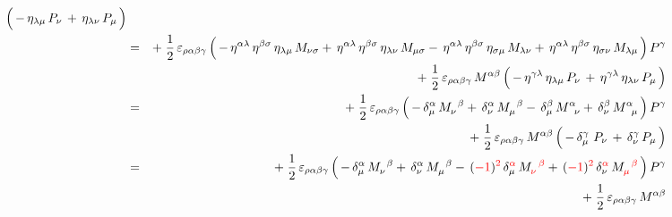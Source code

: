 \begin{enumerate}
\begin{eqnarray*}
		\left(\,
			\overset{{\color{white}.}}{-}\,
			\eta_{\lambda\mu}\,P_{\nu}
			\,+\,
			\eta_{\lambda\nu}\,P_{\mu}
			\,\right)
	\\
	& = &
		{\color{black}+}\;
		\dfrac{1}{2}\,\varepsilon_{\rho\alpha\beta\gamma}
		\left(\,
			\overset{{\color{white}.}}{-}\,
			\eta^{\alpha\lambda}\,\eta^{\beta\sigma}\,\eta_{\lambda\mu}\,M_{\nu\sigma}
			+\,\eta^{\alpha\lambda}\,\eta^{\beta\sigma}\,\eta_{\lambda\nu}\,M_{\mu\sigma}
			-\,\eta^{\alpha\lambda}\,\eta^{\beta\sigma}\,\eta_{\sigma\mu}\,M_{\lambda\nu}
			+\,\eta^{\alpha\lambda}\,\eta^{\beta\sigma}\,\eta_{\sigma\nu}\,M_{\lambda\mu}
			\,\right)
		P^{\gamma}
	\\
	&&
		+\;
		\dfrac{1}{2}\,\varepsilon_{\rho\alpha\beta\gamma}\,M^{\alpha\beta}
		\left(\,
			\overset{{\color{white}.}}{-}\,
			\eta^{\gamma\lambda}\,\eta_{\lambda\mu}\,P_{\nu}
			\,+\,
			\eta^{\gamma\lambda}\,\eta_{\lambda\nu}\,P_{\mu}
			\,\right)
	\\
	& = &
		{\color{black}+}\;
		\dfrac{1}{2}\,\varepsilon_{\rho\alpha\beta\gamma}
		\left(\,
			\overset{{\color{white}.}}{-}\,
			\delta^{\alpha}_{\mu}\,M_{\nu}^{{\color{white}\nu}\beta}
			+\,\delta^{\alpha}_{\nu}\,M_{\mu}^{{\color{white}\mu}\beta}
			-\,\delta^{\beta}_{\mu}\,M^{\alpha}_{{\color{white}\alpha}\nu}
			+\,\delta^{\beta}_{\nu}\,M^{\alpha}_{{\color{white}\alpha}\mu}
			\,\right)
		P^{\gamma}
	\\
	&&
		+\;
		\dfrac{1}{2}\,\varepsilon_{\rho\alpha\beta\gamma}\,M^{\alpha\beta}
		\left(\,
			\overset{{\color{white}.}}{-}\,
			\delta^{\gamma}_{\mu}\,\,P_{\nu}
			\,+\,
			\delta^{\gamma}_{\nu}\,P_{\mu}
			\,\right)
	\\
	& = &
		{\color{black}+}\;
		\dfrac{1}{2}\,\varepsilon_{\rho\alpha\beta\gamma}
		\left(\,
			\overset{{\color{white}.}}{-}\,
			\delta^{\alpha}_{\mu}\,M_{\nu}^{{\color{white}\nu}\beta}
			+\,\delta^{\alpha}_{\nu}\,M_{\mu}^{{\color{white}\mu}\beta}
			-\,({\color{red}-1})^{{\color{red}2}}\,\delta^{{\color{red}\alpha}}_{\mu}\,
				M^{{\color{white}\alpha}{\color{red}\beta}}_{{\color{red}\nu}}
			+\,({\color{red}-1})^{{\color{red}2}}\,\delta^{{\color{red}\alpha}}_{\nu}\,
				M^{{\color{white}\alpha}{\color{red}\beta}}_{{\color{red}\mu}}
			\,\right)
		P^{\gamma}
	\\
	&&
		+\;
		\dfrac{1}{2}\,\varepsilon_{\rho\alpha\beta\gamma}\,M^{\alpha\beta}

\end{eqnarray*}
\end{enumerate}
